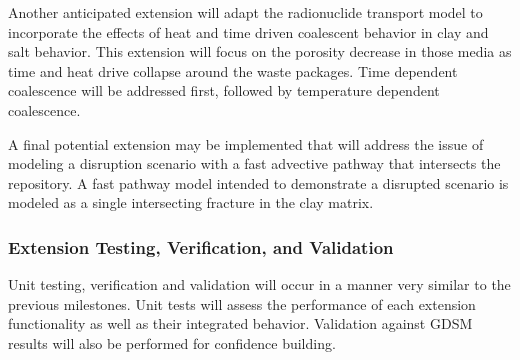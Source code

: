     Another anticipated extension will adapt the radionuclide transport model 
    to incorporate the effects of heat and time driven coalescent behavior in 
    clay and salt behavior. This extension will focus on the porosity decrease 
    in those media as time and heat drive collapse around the waste packages.  
    Time dependent coalescence will be addressed first, followed by temperature  
    dependent coalescence.


    A final potential extension may be implemented that will address the issue of 
    modeling a disruption scenario with a fast advective pathway that intersects 
    the repository.  A fast pathway model intended to demonstrate a disrupted 
    scenario is modeled as a single intersecting fracture in the clay matrix. 



  \subsubsection{Extension Testing, Verification, and Validation}


  Unit testing, verification and validation will occur in a manner very similar 
  to the previous milestones. Unit tests will assess the performance of each 
  extension functionality as well as their integrated behavior. Validation 
  against \gls{GDSM} results will also be performed for confidence building. 




